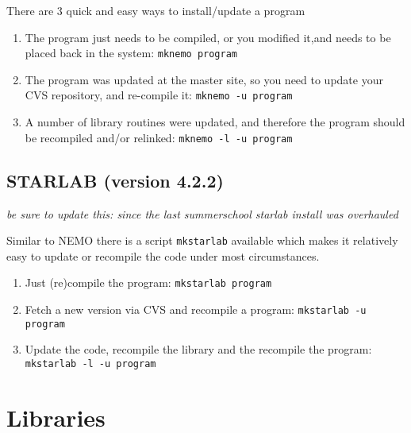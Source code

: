 \begin{itemize}
\begin{itemize}
There are 3 quick and easy ways to install/update a program

\begin{enumerate}

\item
The program just needs to be compiled, or you modified it,and needs to be
placed back in the system:
{\tt mknemo program}

\item
The program was updated at the master site, so you need to update your CVS
repository, and re-compile it:
{\tt mknemo -u program}

\item
A number of library routines were updated, and therefore the program
should be recompiled and/or relinked:
{\tt mknemo -l -u program}

\end{enumerate}

\section{STARLAB (version 4.2.2)}

{\it be sure to update this: since the last summerschool starlab install
was overhauled}

Similar to NEMO there is a script {\tt mkstarlab} available which
makes it relatively easy to update or recompile the code under
most circumstances.

\begin{enumerate}

\item
Just (re)compile the program:
{\tt mkstarlab program}

\item
Fetch a new version via CVS and recompile a program:
{\tt mkstarlab -u program}

\item
Update the code, recompile the library and the recompile the program:
{\tt mkstarlab -l -u program}

\end{enumerate}

\chapter                {Libraries}



\end{itemize}
\end{itemize}
